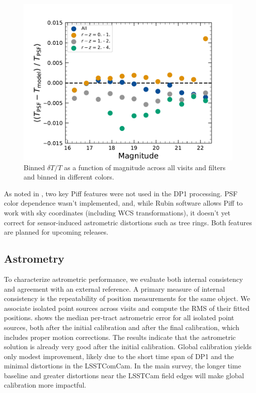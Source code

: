 \begin{figure}[htb!]
\centering
\includegraphics[width=0.98\linewidth]{dT_T_Piff_poly_4_vs_mag.pdf}
\caption{Binned $\delta T/T$ as a function of magnitude across
all visits and filters and binned in different colors.}
\label{fig:psf_residuals_mag_color}
\vspace{0.1cm}
\end{figure}

As noted in  \cite{PSTN-019}, two key Piff features were not used in the DP1 processing. 
PSF color dependence wasn’t implemented, and, while Rubin software allows Piff to work with sky coordinates (including WCS transformations), it doesn’t yet correct for sensor-induced astrometric distortions such as tree rings. 
Both features are planned for upcoming releases.


\subsection{Astrometry}
To characterize astrometric performance, we evaluate both internal consistency and agreement with an external reference.
A primary measure of internal consistency is the repeatability of position measurements for the same object. We associate isolated point sources across visits and compute the \gls{RMS} of their fitted positions.
 shows the median per-\gls{tract} astrometric error for all isolated point sources, both after the initial calibration and after the final calibration, which includes proper motion corrections.
The results indicate that the astrometric solution is already very good after the initial \gls{calibration}.
Global calibration yields only modest improvement, likely due to the short time span of \gls{DP1} and the minimal distortions in the LSSTComCam.
In the main survey, the longer time baseline and greater distortions near the \gls{LSSTCam} field edges will make global calibration more impactful.

